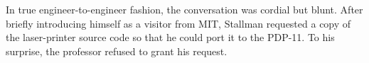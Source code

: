 






\ifdefined\eng
In true engineer-to-engineer fashion, the conversation was cordial but blunt. After briefly introducing himself as a visitor from MIT, Stallman requested a copy of the laser-printer source code so that he could port it to the PDP-11. To his surprise, the professor refused to grant his request.
\fi

